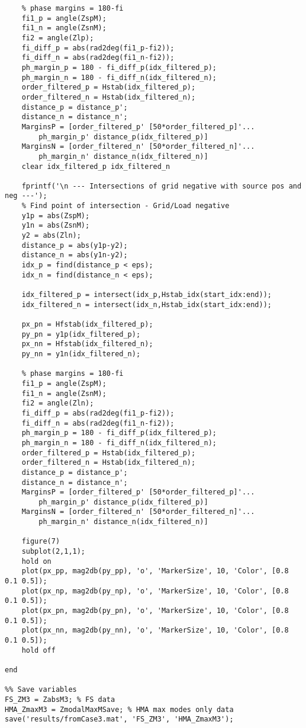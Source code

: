 \begin{appendices}
\begin{lstlisting}
    % phase margins = 180-fi
    fi1_p = angle(ZspM);
    fi1_n = angle(ZsnM);
    fi2 = angle(Zlp);
    fi_diff_p = abs(rad2deg(fi1_p-fi2));
    fi_diff_n = abs(rad2deg(fi1_n-fi2));
    ph_margin_p = 180 - fi_diff_p(idx_filtered_p);
    ph_margin_n = 180 - fi_diff_n(idx_filtered_n);
    order_filtered_p = Hstab(idx_filtered_p);
    order_filtered_n = Hstab(idx_filtered_n);
    distance_p = distance_p';
    distance_n = distance_n';
    MarginsP = [order_filtered_p' [50*order_filtered_p]'...
        ph_margin_p' distance_p(idx_filtered_p)]
    MarginsN = [order_filtered_n' [50*order_filtered_n]'...
        ph_margin_n' distance_n(idx_filtered_n)]  
    clear idx_filtered_p idx_filtered_n
    
    fprintf('\n --- Intersections of grid negative with source pos and neg ---');
    % Find point of intersection - Grid/Load negative
    y1p = abs(ZspM);
    y1n = abs(ZsnM);
    y2 = abs(Zln);
    distance_p = abs(y1p-y2);
    distance_n = abs(y1n-y2);
    idx_p = find(distance_p < eps);
    idx_n = find(distance_n < eps);
    
    idx_filtered_p = intersect(idx_p,Hstab_idx(start_idx:end));
    idx_filtered_n = intersect(idx_n,Hstab_idx(start_idx:end));
    
    px_pn = Hfstab(idx_filtered_p);
    py_pn = y1p(idx_filtered_p);
    px_nn = Hfstab(idx_filtered_n);
    py_nn = y1n(idx_filtered_n);
    
    % phase margins = 180-fi
    fi1_p = angle(ZspM);
    fi1_n = angle(ZsnM);
    fi2 = angle(Zln);
    fi_diff_p = abs(rad2deg(fi1_p-fi2));
    fi_diff_n = abs(rad2deg(fi1_n-fi2));
    ph_margin_p = 180 - fi_diff_p(idx_filtered_p);
    ph_margin_n = 180 - fi_diff_n(idx_filtered_n);
    order_filtered_p = Hstab(idx_filtered_p);
    order_filtered_n = Hstab(idx_filtered_n);
    distance_p = distance_p';
    distance_n = distance_n';
    MarginsP = [order_filtered_p' [50*order_filtered_p]'...
        ph_margin_p' distance_p(idx_filtered_p)]
    MarginsN = [order_filtered_n' [50*order_filtered_n]'...
        ph_margin_n' distance_n(idx_filtered_n)]
    
    figure(7)
    subplot(2,1,1); 
    hold on
    plot(px_pp, mag2db(py_pp), 'o', 'MarkerSize', 10, 'Color', [0.8 0.1 0.5]);
    plot(px_np, mag2db(py_np), 'o', 'MarkerSize', 10, 'Color', [0.8 0.1 0.5]);
    plot(px_pn, mag2db(py_pn), 'o', 'MarkerSize', 10, 'Color', [0.8 0.1 0.5]);
    plot(px_nn, mag2db(py_nn), 'o', 'MarkerSize', 10, 'Color', [0.8 0.1 0.5]);
    hold off
    
end   

%% Save variables
FS_ZM3 = ZabsM3; % FS data
HMA_ZmaxM3 = ZmodalMaxMSave; % HMA max modes only data
save('results/fromCase3.mat', 'FS_ZM3', 'HMA_ZmaxM3');
\end{lstlisting}
\end{appendices}
